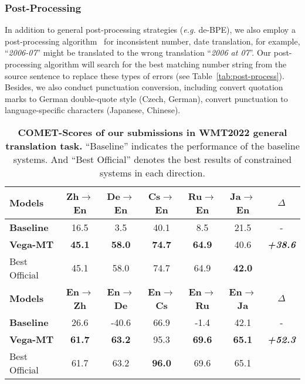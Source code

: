 \documentclass[11pt,a4paper]{article}
\newcommand{\zct}{\color{black}}
\begin{document}
\subsubsection{Post-Processing}
\label{ssec:post}
In addition to general post-processing strategies (\textit{e.g.} de-BPE), we also employ a post-processing algorithm~\cite{wang-etal-2018-niutrans} for inconsistent number, date translation, for example, ``\textit{2006-07}'' might be translated to the wrong translation ``\textit{2006 at 07}''. Our post-processing algorithm will search for the best matching number string from the source sentence to replace these types of errors {\zct (see Table~\ref{tab:post-process})}.
Besides, we also conduct punctuation conversion, including convert quotation marks to German
double-quote style (Czech, German), convert punctuation to language-specific characters (Japanese, Chinese).


\begin{table*}[t]
    \centering 
    \begin{tabular}{lcccccc}
    \toprule
    \textbf{Models}        & \textbf{Zh$\rightarrow$En} & \textbf{De$\rightarrow$En} & \textbf{Cs$\rightarrow$En} & \textbf{Ru$\rightarrow$En} & \textbf{Ja$\rightarrow$En} & \textbf{$\Delta$}\\ \hline
    \textbf{Baseline}      & 16.5           & 3.5             & 40.1            & 8.5             & 21.5           &- \\
    \textbf{Vega-MT}    & \textbf{45.1}   & \textbf{58.0}   & \textbf{74.7}   & \textbf{64.9}   & 40.6           &\textbf{\textit{+38.6}}\\ \hdashline
    {Best Official} & 45.1            & 58.0            & 74.7            & 64.9            & \bf 42.0            \\ \midrule
    \textbf{Models}        & \textbf{En$\rightarrow$Zh} & \textbf{En$\rightarrow$De} & \textbf{En$\rightarrow$Cs} & \textbf{En$\rightarrow$Ru} & \textbf{En$\rightarrow$Ja} &\textbf{$\Delta$}\\\hline
    \textbf{Baseline}      & 26.6            & -40.6           & 66.9            & -1.4            & 42.1            &-\\
    \textbf{Vega-MT}    & \textbf{61.7}   & \textbf{63.2}   & {95.3}   & \textbf{69.6}   & \textbf{65.1}  &\textbf{\textit{+52.3}} \\ \hdashline
    {Best Official} & 61.7            & 63.2            & \bf 96.0            & 69.6            & 65.1            \\ 
    \bottomrule
    \end{tabular}
    \caption{\label{tab:comet} \textbf{COMET-Scores of our submissions in WMT2022 general translation task.} ``Baseline'' indicates the performance of the baseline systems. And ``Best Official'' denotes the best results of {\zct constrained systems} in each direction.}
\end{table*}
\end{document}
